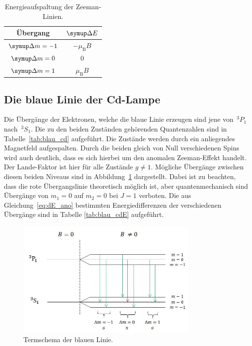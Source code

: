 \begin{table}[H]
    \centering
    \caption{Energieaufspaltung der Zeeman-Linien.}
    \begin{tabular}{cc}
        \toprule
    {Übergang} & {$\upD E$} \\
		\midrule
	  $\upD m=-1$ & $-\mu_{\mathup{B}}B$ \\
    $\upD m=0$ & 0 \\
    $\upD m=1$ & $\mu_{\mathup{B}}B$ \\
    \bottomrule
	\end{tabular}
    \label{tab:rot_cdE}
\end{table}

\subsection{Die blaue Linie der Cd-Lampe}
Die Übergänge der Elektronen, welche die blaue Linie erzeugen sind jene
von~$^{3}P_1$ nach~$^{3}S_1$. Die zu den beiden Zuständen gehörenden Quantenzahlen
sind in Tabelle~\ref{tab:blau_cd} aufgeführt. Die Zustände werden durch ein
anliegendes Magnetfeld aufgespalten. Durch die beiden gleich von Null verschiedenen
Spins wird auch deutlich, dass es sich hierbei um den anomalen Zeeman-Effekt handelt.
Der Lande-Faktor ist hier für alle Zustände $g\neq1$. Mögliche Übergänge zwischen
diesen beiden Niveaus sind in Abbildung~\ref{fig:therm_blau} dargestellt. Dabei ist
zu beachten, dass die rote Übergangslinie theoretisch möglich ist, aber quantenmechanisch
sind Übergänge von $m_1 = 0$ auf $m_2 = 0$ bei $J=1$ verboten.  Die aus
Gleichung~\eqref{eq:dE_ano} bestimmten Energiedifferenzen der verschiedenen Übergänge
sind in Tabelle \ref{tab:blau_cdE} aufgeführt.

\begin{figure}
    \centering
    \includegraphics[width=0.8\textwidth]{graphics/termschema_blau.jpg}
    \caption{Termschema der blauen Linie.}
    \label{fig:therm_blau}
\end{figure}

